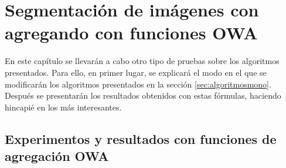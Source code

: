 \chapter{Segmentación de imágenes con agregando con funciones OWA}

En este capítulo se llevarán a cabo otro tipo de pruebas sobre los algoritmos presentados. Para ello, en primer lugar, se explicará el modo en el que se modificarán los algoritmos presentados en la sección \ref{sec:algoritmosmono}. Después se presentarán los resultados obtenidos con estas fórmulas, haciendo hincapié en los más interesantes.

%

\section{Experimentos y resultados con funciones de agregación OWA}
